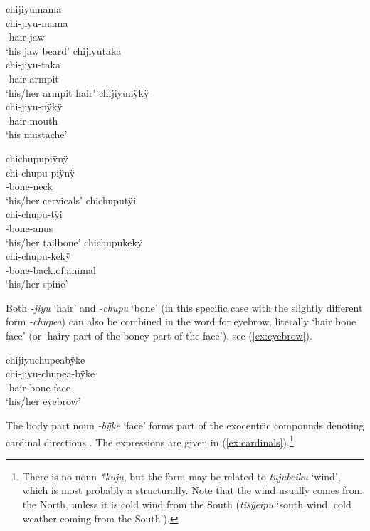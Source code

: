 \ea\label{ex:jiyu}
  \ea\label{ex:jiyu.1}
\begingl
\glpreamble chijiyumama\\
\gla chi-jiyu-mama\\
-hair-jaw\\
\glft ‘his jaw beard’
\endgl
  \ex\label{ex:jiyu.2}
\begingl
\glpreamble chijiyutaka\\
\gla chi-jiyu-taka\\
-hair-armpit\\
\glft ‘his/her armpit hair’
\endgl
  \ex\label{ex:jiyu.3}
\begingl
\glpreamble chijiyunÿkÿ\\
\gla chi-jiyu-nÿkÿ\\
-hair-mouth\\
\glft ‘his mustache’
\endgl
\z
\xe

\ea\label{ex:chupu}
  \ea\label{ex:chupu.1}
\begingl
\glpreamble chichupupiÿnÿ\\
\gla chi-chupu-piÿnÿ\\
-bone-neck\\
\glft ‘his/her cervicals’
\endgl
  \ex\label{ex:chupu.2}
\begingl
\glpreamble chichuputÿi\\
\gla chi-chupu-tÿi\\
-bone-anus\\
\glft ‘his/her tailbone’
\endgl
  \ex\label{ex:chupu.3}
\begingl
\glpreamble chichupukekÿ\\
\gla chi-chupu-kekÿ\\
-bone-back.of.animal\\
\glft ‘his/her spine’
\endgl
\z
\xe

Both \textit{-jiyu} ‘hair’ and \textit{-chupu} ‘bone’ (in this specific case with the slightly different form \mbox{\textit{-chupea}}) can also be combined in the word for eyebrow, literally ‘hair bone face’ (or ‘hairy part of the boney part of the face’), see (\ref{ex:eyebrow}).

\ea\label{ex:eyebrow}
\begingl 
\glpreamble chijiyuchupeabÿke\\
\gla chi-jiyu-chupea-bÿke\\ 
-hair-bone-face\\ 
\glft ‘his/her eyebrow’\\ 
\endgl
\xe

The body part noun \textit{-bÿke} ‘face’ forms part of the exocentric compounds denoting cardinal directions \citep[266]{TerhartDanielsenBODY}. The expressions are given in (\ref{ex:cardinals}).\footnote{There is no noun \textit{*kuju}, but the form may be related to \textit{tujubeiku} ‘wind’, which is most probably a  structurally. Note that the wind usually comes from the North, unless it is cold wind from the South (\textit{tisÿeipu} ‘south wind, cold weather coming from the South’).}

